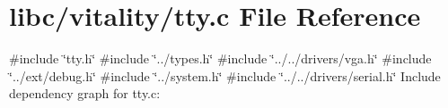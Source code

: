 \hypertarget{a00173}{}\section{libc/vitality/tty.c File Reference}
\label{a00173}
{\ttfamily \#include \char`\"{}tty.\+h\char`\"{}}\newline
{\ttfamily \#include \char`\"{}../types.\+h\char`\"{}}\newline
{\ttfamily \#include \char`\"{}../../drivers/vga.\+h\char`\"{}}\newline
{\ttfamily \#include \char`\"{}../ext/debug.\+h\char`\"{}}\newline
{\ttfamily \#include \char`\"{}../system.\+h\char`\"{}}\newline
{\ttfamily \#include \char`\"{}../../drivers/serial.\+h\char`\"{}}\newline
Include dependency graph for tty.\+c\+:
